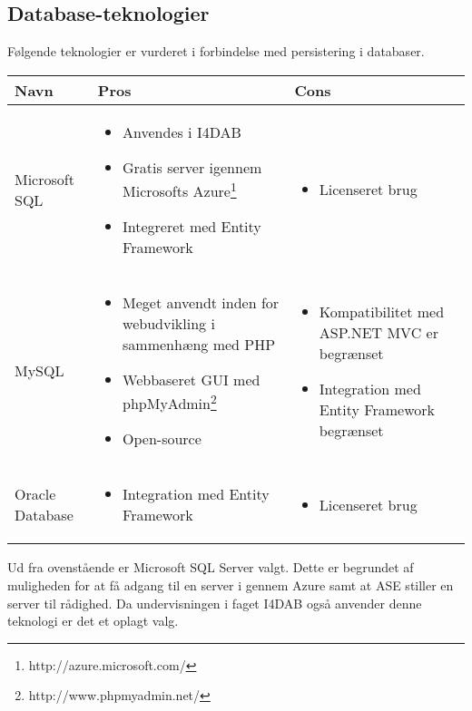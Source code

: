 \subsection*{Database-teknologier}

Følgende teknologier er vurderet i forbindelse med persistering i databaser.

\begin{savenotes}
\begin{tabular}{|p{3cm}|p{5.5cm}|p{5.5cm}|}
\hline 
\textbf{Navn} & \textbf{Pros} & \textbf{Cons} \\ 
\hline

Microsoft SQL
	&
	\begin{itemize}
		\item Anvendes i I4DAB
		\item Gratis server igennem Microsofts Azure\footnote{http://azure.microsoft.com/}
		\item Integreret med Entity Framework
	\end{itemize}
	&
	\begin{itemize}
		\item Licenseret brug
	\end{itemize}
	\\
	\hline

MySQL
	&
	\begin{itemize}
		\item Meget anvendt inden for webudvikling i sammenhæng med PHP
		\item Webbaseret GUI med phpMyAdmin\footnote{http://www.phpmyadmin.net/}
		\item Open-source
	\end{itemize}
	&
	\begin{itemize}
		\item Kompatibilitet med ASP.NET MVC er begrænset
		\item Integration med Entity Framework begrænset
	\end{itemize}
	\\
	\hline

Oracle Database
	&
	\begin{itemize}
		\item Integration med Entity Framework
	\end{itemize}
	&
	\begin{itemize}
	\item Licenseret brug
	\end{itemize}
	\\
	\hline
\end{tabular}
\end{savenotes} 

Ud fra ovenstående er Microsoft SQL Server valgt. Dette er begrundet af muligheden for at få adgang til en server i gennem Azure samt at ASE stiller en server til rådighed. Da undervisningen i faget I4DAB også anvender denne teknologi er det et oplagt valg.
